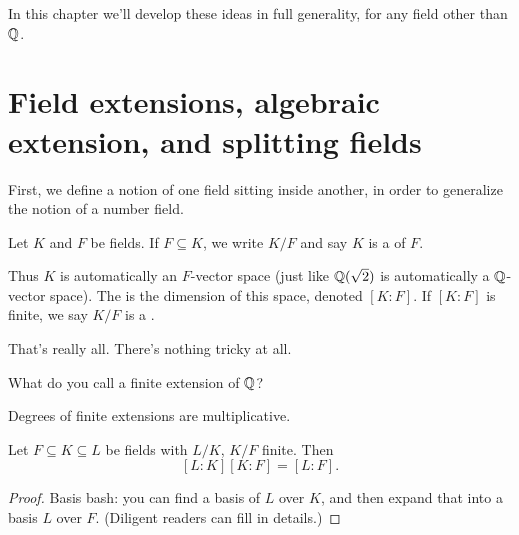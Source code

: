 In this chapter we'll develop these ideas in full generality, for any field other than $\mathbb Q$.

\section{Field extensions, algebraic extension, and splitting fields}

First, we define a notion of one field sitting inside another,
in order to generalize the notion of a number field.
\begin{definition}
	Let $K$ and $F$ be fields.
	If $F \subseteq K$, we write $K/F$ and say $K$ is a
	 of $F$.

	Thus $K$ is automatically an $F$-vector space
	(just like $\mathbb Q(\sqrt 2)$ is automatically a $\mathbb Q$-vector space).
	The  is the dimension of this space, denoted $[K:F]$.
	If $[K:F]$ is finite, we say $K/F$ is a .
\end{definition}
That's really all. There's nothing tricky at all.

\begin{ques}
	What do you call a finite extension of $\mathbb Q$?
\end{ques}

Degrees of finite extensions are multiplicative.
\begin{theorem}
	Let $F \subseteq K \subseteq L$ be fields with $L/K$, $K/F$ finite. Then
	\[ [L:K][K:F] = [L:F]. \]
\end{theorem}
\begin{proof}
	Basis bash: you can find a basis of $L$ over $K$,
	and then expand that into a basis $L$ over $F$.
	(Diligent readers can fill in details.)
\end{proof}

